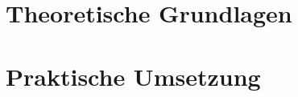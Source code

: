 

\frenchspacing
\raggedbottom
{} %
\pagestyle{plain}

\condTWOSIDE{}
\cleardoublepage
\condLOCK{\cleardoublepage}
\condDOUBLESPACING{\onehalfspacing}
\cleardoublepage
\cleardoublepage
\pagestyle{scrheadings}
\cleardoublepage
\cleardoublepage
\cleardoublepage
\cleardoublepage
\cleardoublepage
\setcounter{page}{1}




\cleardoublepage\part{Theoretische Grundlagen}


\cleardoublepage\part{Praktische Umsetzung}


\appendix

%

\cleardoublepage

